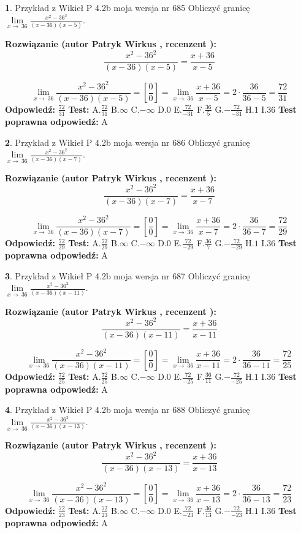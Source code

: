 \documentclass[12pt, a4paper]{article}
\theoremstyle{definition} %
\newtheorem{zad}{}
\newcommand{\zadStart}[1]{\begin{zad}#1\newline}
\newcommand{\zadStop}{\end{zad}}
\newcommand{\rozwStart}[2]{\noindent \textbf{Rozwiązanie (autor #1 , recenzent #2): }\newline}
\newcommand{\rozwStop}{\newline}
\newcommand{\odpStart}{\noindent \textbf{Odpowiedź:}\newline}
\newcommand{\odpStop}{\newline}
\newcommand{\testStart}{\noindent \textbf{Test:}\newline}
\newcommand{\testStop}{\newline}
\newcommand{\kluczStart}{\noindent \textbf{Test poprawna odpowiedź:}\newline}
\newcommand{\kluczStop}{\newline}
\begin{document}
\zadStart{Przykład z Wikieł P 4.2b moja wersja nr 685}
Obliczyć granicę $\lim\limits_{x\to\ 36}\frac{x^{2}-36^{2}}{(x-36)(x-5)}$.
\zadStop
\rozwStart{Patryk Wirkus}{}
$$\frac{x^{2}-36^{2}}{(x-36)(x-5)}=\frac{x+36}{x-5}$$

$$\lim\limits_{x\to\ 36}\frac{x^{2}-36^{2}}{(x-36)(x-5)}=[\frac{0}{0}]=\lim\limits_{x\to\ 36}\frac{x+36}{x-5}=2 \cdot \frac{36}{36-5} = \frac{72}{31}$$
\rozwStop
\odpStart
$\frac{72}{31}$
\odpStop
\testStart
A.$\frac{72}{31}$
B.$\infty$
C.$-\infty$
D.$0$
E.$\frac{72}{-31}$
F.$\frac{36}{5}$
G.$-\frac{72}{-31}$
H.$1$
I.$36$
\testStop
\kluczStart
A
\kluczStop



\zadStart{Przykład z Wikieł P 4.2b moja wersja nr 686}
Obliczyć granicę $\lim\limits_{x\to\ 36}\frac{x^{2}-36^{2}}{(x-36)(x-7)}$.
\zadStop
\rozwStart{Patryk Wirkus}{}
$$\frac{x^{2}-36^{2}}{(x-36)(x-7)}=\frac{x+36}{x-7}$$

$$\lim\limits_{x\to\ 36}\frac{x^{2}-36^{2}}{(x-36)(x-7)}=[\frac{0}{0}]=\lim\limits_{x\to\ 36}\frac{x+36}{x-7}=2 \cdot \frac{36}{36-7} = \frac{72}{29}$$
\rozwStop
\odpStart
$\frac{72}{29}$
\odpStop
\testStart
A.$\frac{72}{29}$
B.$\infty$
C.$-\infty$
D.$0$
E.$\frac{72}{-29}$
F.$\frac{36}{7}$
G.$-\frac{72}{-29}$
H.$1$
I.$36$
\testStop
\kluczStart
A
\kluczStop



\zadStart{Przykład z Wikieł P 4.2b moja wersja nr 687}
Obliczyć granicę $\lim\limits_{x\to\ 36}\frac{x^{2}-36^{2}}{(x-36)(x-11)}$.
\zadStop
\rozwStart{Patryk Wirkus}{}
$$\frac{x^{2}-36^{2}}{(x-36)(x-11)}=\frac{x+36}{x-11}$$

$$\lim\limits_{x\to\ 36}\frac{x^{2}-36^{2}}{(x-36)(x-11)}=[\frac{0}{0}]=\lim\limits_{x\to\ 36}\frac{x+36}{x-11}=2 \cdot \frac{36}{36-11} = \frac{72}{25}$$
\rozwStop
\odpStart
$\frac{72}{25}$
\odpStop
\testStart
A.$\frac{72}{25}$
B.$\infty$
C.$-\infty$
D.$0$
E.$\frac{72}{-25}$
F.$\frac{36}{11}$
G.$-\frac{72}{-25}$
H.$1$
I.$36$
\testStop
\kluczStart
A
\kluczStop



\zadStart{Przykład z Wikieł P 4.2b moja wersja nr 688}
Obliczyć granicę $\lim\limits_{x\to\ 36}\frac{x^{2}-36^{2}}{(x-36)(x-13)}$.
\zadStop
\rozwStart{Patryk Wirkus}{}
$$\frac{x^{2}-36^{2}}{(x-36)(x-13)}=\frac{x+36}{x-13}$$

$$\lim\limits_{x\to\ 36}\frac{x^{2}-36^{2}}{(x-36)(x-13)}=[\frac{0}{0}]=\lim\limits_{x\to\ 36}\frac{x+36}{x-13}=2 \cdot \frac{36}{36-13} = \frac{72}{23}$$
\rozwStop
\odpStart
$\frac{72}{23}$
\odpStop
\testStart
A.$\frac{72}{23}$
B.$\infty$
C.$-\infty$
D.$0$
E.$\frac{72}{-23}$
F.$\frac{36}{13}$
G.$-\frac{72}{-23}$
H.$1$
I.$36$
\testStop
\kluczStart
A
\kluczStop
\end{document}

